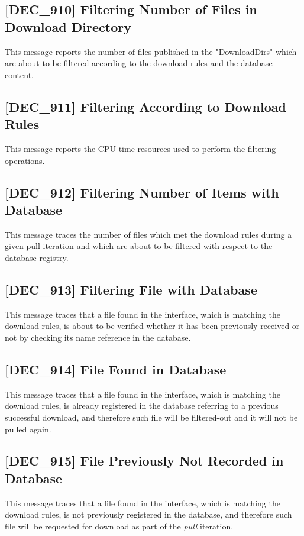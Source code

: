 \documentclass[dec_sum_main.tex]{subfiles}
\begin{document}
\subsection{[DEC\_910] Filtering Number of Files in Download Directory}
\label{DEC910}
This message reports the number of files published in the \hyperref[DownloadDirs]{"DownloadDirs"} which are about to be filtered according to the download rules and the database content.

\subsection{[DEC\_911] Filtering According to Download Rules}
\label{DEC911}
This message reports the CPU time resources used to perform the filtering operations.

\label{DEC912}
\subsection{[DEC\_912] Filtering Number of Items with Database}
This message traces the number of files which met the download rules during a given pull iteration and which are about to be filtered with respect to the database registry.

\label{DEC913}
\subsection{[DEC\_913] Filtering File with Database}
This message traces that a file found in the interface, which is matching the download rules, is about to be verified whether it has been previously received or not by checking its name reference in the database. 

\label{DEC914}
\subsection{[DEC\_914] File Found in Database}
This message traces that a file found in the interface, which is matching the download rules, is already registered in the database referring to a previous successful download, and therefore such file will be filtered-out and it will not be pulled again.

\label{DEC915}
\subsection{[DEC\_915] File Previously Not Recorded in Database}
This message traces that a file found in the interface, which is matching the download rules, is not previously registered in the database, and therefore such file will be requested for download as part of the \textit{pull} iteration.
\end{document}
